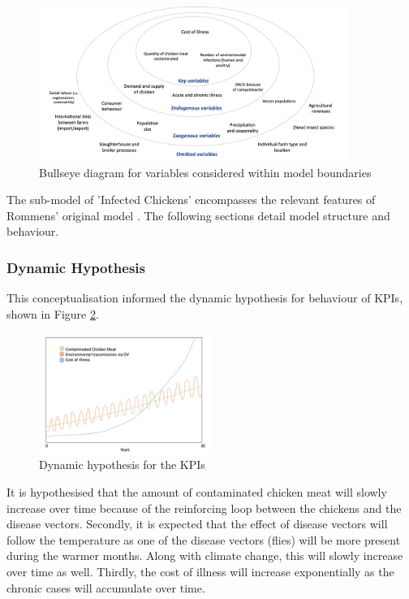 \begin{figure}[h]
\centering
\includegraphics[width=0.90\textwidth]{images/bullseye.png}
\caption{Bullseye diagram for variables considered within model boundaries}
\label{fig:bullseye}
\end{figure}

The sub-model of 'Infected Chickens' encompasses the relevant features of Rommens' original model \parencite{rommens_infected_2020}. The following sections detail model structure and behaviour. 

\subsubsection*{Dynamic Hypothesis}

This conceptualisation informed the dynamic hypothesis for behaviour of KPIs, shown in Figure \ref{fig:dynamic_hypothesis}. 

\begin{figure}[h]
\centering
\includegraphics[width=0.50\textwidth]{images/KPI_dynamic_hypo.png}
\caption{Dynamic hypothesis for the KPIs}
\label{fig:dynamic_hypothesis}
\end{figure}

It is hypothesised that the amount of contaminated chicken meat will slowly increase over time because of the reinforcing loop between the chickens and the disease vectors. 
Secondly, it is expected that the effect of disease vectors will follow the temperature as one of the disease vectors (flies) will be more present during the warmer months. Along with climate change, this will slowly increase over time as well. 
Thirdly, the cost of illness will increase exponentially as the chronic cases will accumulate over time. 


